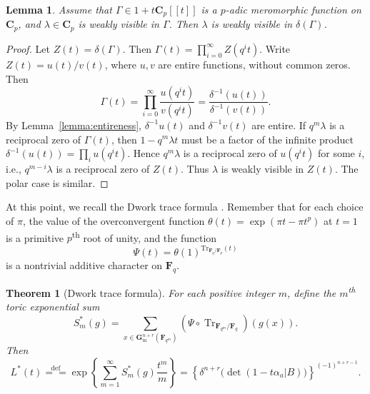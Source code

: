 \documentclass{amsart}
\numberwithin{equation}{section}
\theoremstyle{plain}
\newtheorem{theorem}[equation]{Theorem}
\newtheorem{lemma}[equation]{Lemma}
\theoremstyle{definition}
\renewcommand{\mathbb}{\mathbf}
\begin{document}
\begin{lemma}\label{lemma:moebius}
  Assume that \(\Gamma \in 1 +t \mathbb{C}_{p}[\![t]\!]\) is a \(p\)-adic meromorphic function on
  \(\mathbb{C}_{p}\), and \(\lambda \in \mathbb{C}_p\) is weakly visible in \(\Gamma\). Then
  \(\lambda\) is weakly visible in \(\delta(\Gamma)\).
\end{lemma}

\begin{proof}
Let \(Z(t) = \delta(\Gamma)\).  Then
\(\Gamma(t) = \prod_{i=0}^{\infty}Z(q^{i}t)\).  Write
\(Z(t) = u(t)/v(t)\), where \(u,v\) are entire functions, without
common zeros.  Then
\begin{equation*}
\Gamma(t) = \prod_{i=0}^{\infty} \frac{u(q^i t)}{v(q^i t)} = \frac{\delta^{-1}(u(t))}{\delta^{-1}(v(t))}.
\end{equation*}
By Lemma~\ref{lemma:entireness}, \(\delta^{-1}u(t)\) and
\(\delta^{-1}v(t)\) are entire.  If \(q^{m}\lambda\) is a reciprocal
zero of \(\Gamma(t)\), then \(1-q^{m}\lambda t\) must be a factor of
the infinite product \(\delta^{-1}(u(t))=\prod_{i}u(q^{i}t)\).  Hence
\(q^{m}\lambda\) is a reciprocal zero of \(u(q^{i}t)\) for some \(i\),
i.e., \(q^{m-i}\lambda\) is a reciprocal zero of \(Z(t)\).  Thus
\(\lambda\) is weakly visible in \(Z(t)\).  The polar case is similar.
\end{proof}


At this point, we recall the Dwork trace formula \cite[Lemma~2,
p.~637]{dwork:rationality-zeta-function}.
Remember that for each choice of \(\pi\),
the value of the overconvergent function \(\theta(t) = \exp(\pi t - \pi t^{p})\)
at \(t = 1\) is a primitive \(p\)\textsuperscript{th} root of unity, and
the function
\begin{equation}\label{eq:additive-character}
\Psi(t) = \theta(1)^{\mathrm{Tr}_{\mathbb{F}_{q}/\mathbb{F}_{p}}(t)}
\end{equation}
is a nontrivial additive character on \(\mathbb{F}_{q}\).

\begin{theorem}[Dwork trace formula]%
\label{theorem:dwrok-trace-formula}
For each positive integer $m$, define the $m$\textsuperscript{th} toric exponential sum
\[
S^{\ast}_m(g)=\sum\limits_{x\in\mathbb{G}_{\mathrm{m}}^{n+r}(\mathbb{F}_{q^m})}(\Psi\circ\operatorname{Tr}_{\mathbb{F}_{q^m}/\mathbb{F}_q})(g(x)).
\]
Then
\begin{equation*}
L^{*}(t)\overset{\mathrm{def}}{=\!=}\exp\left\{ \sum_{m=1}^{\infty} S_{m}^{\ast}(g)\frac{t^{m}}{m} \right\}
= \left\{ \delta^{n+r}\big(\det(1 - t\alpha_{a}| B)\big) \right\}^{(-1)^{n+r-1}}.
\end{equation*}
\end{theorem}
\end{document}
